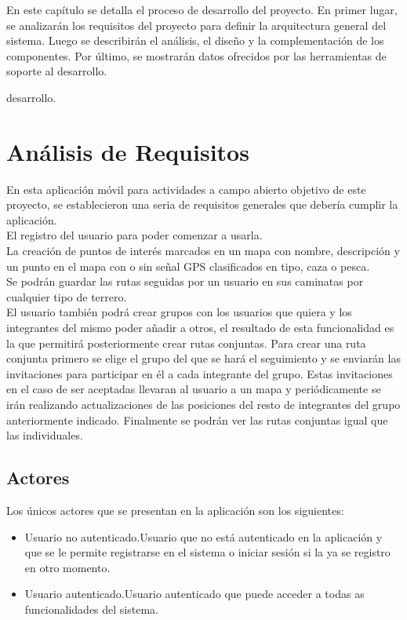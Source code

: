 En este capítulo se detalla el proceso de desarrollo del proyecto. En primer lugar, se analizarán los requisitos del proyecto para definir la arquitectura general del sistema. Luego se describirán el análisis, el diseño y la complementación de los componentes. Por último, se mostrarán datos ofrecidos por las herramientas de soporte al desarrollo.
 
 
 desarrollo.
  
\section{Análisis de Requisitos}


En esta aplicación móvil para actividades a campo abierto objetivo de este proyecto, se establecieron una seria de requisitos generales que debería cumplir la aplicación.\\

El registro del usuario para poder comenzar a usarla.\\

La creación de puntos de interés marcados en un mapa con nombre, descripción y un punto en el mapa con o sin señal GPS clasificados en tipo, caza o pesca. \\

Se podrán guardar las rutas seguidas por un usuario en sus caminatas por cualquier tipo de terrero.\\

El usuario también podrá crear grupos con los usuarios que quiera y los integrantes del mismo poder añadir a otros, el resultado de esta funcionalidad es la que permitirá posteriormente  crear rutas conjuntas. Para crear una ruta conjunta primero se elige el grupo del que se hará el seguimiento y se enviarán  las invitaciones para participar en él a cada integrante del grupo. Estas invitaciones en el caso de ser aceptadas llevaran al usuario a un mapa y periódicamente se irán realizando actualizaciones de las posiciones del resto de integrantes del grupo anteriormente indicado. Finalmente se podrán ver las rutas conjuntas igual que las individuales.
\subsection{Actores}

Los únicos actores que se presentan en la  aplicación son los siguientes:
\begin{itemize}
\item Usuario no  autenticado.Usuario que no está autenticado en la aplicación y que
se le permite registrarse en el  sistema o iniciar sesión si la ya se registro en otro momento.
\item Usuario  autenticado.Usuario autenticado que puede acceder a todas as funcionalidades
del sistema.
\end{itemize}
